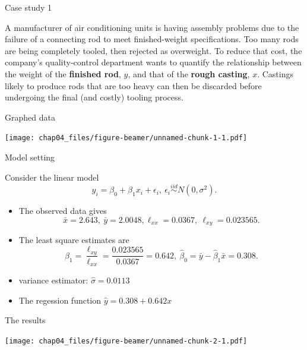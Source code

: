 \documentclass[ignorenonframetext,]{beamer}
\begin{document}
\begin{frame}{Case study 1}
\protect\hypertarget{case-study-1}{}

A manufacturer of air conditioning units is having assembly problems due
to the failure of a connecting rod to meet finished-weight
specifications. Too many rods are being completely tooled, then rejected
as overweight. To reduce that cost, the company's quality-control
department wants to quantify the relationship between the weight of the
\textbf{finished rod}, \(y\), and that of the \textbf{rough casting},
\(x\). Castings likely to produce rods that are too heavy can then be
discarded before undergoing the final (and costly) tooling process.

\end{frame}

\begin{frame}{Graphed data}
\protect\hypertarget{graphed-data}{}

\texttt{[image: chap04\_files/figure-beamer/unnamed-chunk-1-1.pdf]}

\end{frame}

\begin{frame}{Model setting}
\protect\hypertarget{model-setting}{}

Consider the linear model
\[y_i=\beta_0+\beta_1x_i+\epsilon_i,\ \epsilon_i\stackrel{iid}{\sim}N(0,\sigma^2).\]

\begin{itemize}
\item
  The observed data gives
  \[\bar x = 2.643,\ \bar y=2.0048,\ell_{xx}=0.0367,\ \ell_{xy}=0.023565.\]
\item
  The least square estimates are
  \[\hat\beta_1=\frac{\ell_{xy}}{\ell_{xx}}=\frac{0.023565}{0.0367}=0.642,\ \hat\beta_0=\bar y-\hat\beta_1\bar x=0.308.\]
\item
  variance estimator: \(\hat\sigma = 0.0113\)
\item
  The regession function \(\hat y = 0.308+0.642 x\)
\end{itemize}

\end{frame}

\begin{frame}{The results}
\protect\hypertarget{the-results}{}

\texttt{[image: chap04\_files/figure-beamer/unnamed-chunk-2-1.pdf]}

\end{frame}
\end{document}
